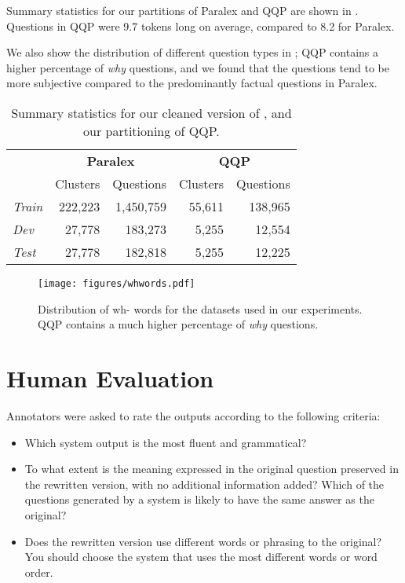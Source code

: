 \documentclass[11pt,a4paper]{article}
\begin{document}
Summary statistics for our partitions of Paralex and QQP are shown in . Questions in QQP were 9.7 tokens long on average, compared to 8.2 for Paralex.

We also show the distribution of different question types in ; QQP contains a higher percentage of \textit{why} questions, and we found that the questions tend to be more subjective compared to the predominantly factual questions in Paralex.

\begin{table}[ht]
    \centering
\small
    
    \begin{tabular}{l|rr|rr}
        & \multicolumn{2}{c}{\textbf{Paralex}} & \multicolumn{2}{c}{\textbf{QQP}} \\
        & Clusters & Questions & Clusters & Questions \\
        \hline
        \textit{Train} & 222,223 & 1,450,759 & 55,611 & 138,965  \\
        \textit{Dev} & 27,778 & 183,273 & 5,255 & 12,554 \\
        \textit{Test}  & 27,778 & 182,818 & 5,255 & 12,225
    \end{tabular}
    
    \caption{Summary statistics for our cleaned version of \cite{fader-etal-2013-paraphrase}, and our partitioning of QQP.}
    \label{tab:dataset}
\end{table}

\begin{figure}[ht]
    \centering
    \texttt{[image: figures/whwords.pdf]}
\vspace*{-.3cm}
    \caption{Distribution of wh- words for the datasets used in our experiments. QQP contains a much higher percentage of \textit{why} questions. }
    \label{fig:whwords}
\end{figure}

\section{Human Evaluation}
\label{app:humeval}

Annotators were asked to rate the outputs according to the following criteria:

\begin{itemize}
    \item Which system output is the most fluent and grammatical?
    \item To what extent is the meaning expressed in the original
      question preserved in the rewritten version, with no additional
      information added? Which of the questions generated by a system
      is likely to have the same answer as the original?
    \item Does the rewritten version use different words or phrasing to the original? You should choose the system that uses the most different words or word order.
\end{itemize}
\end{document}
